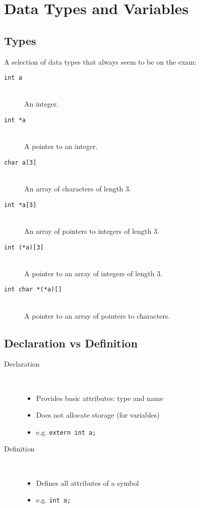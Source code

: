 \documentclass[a4paper]{article}
\begin{document}
\tableofcontents

\section{Data Types and Variables}

\subsection{Types}

A selection of data types that always seem to be on the exam:

\begin{description}
  \item[\texttt{int a}] \hfill \\
    An integer.
  \item[\texttt{int *a}] \hfill \\
    A pointer to an integer.
  \item[\texttt{char a[3]}] \hfill \\
    An array of characters of length 3.
  \item[\texttt{int *a[3]}] \hfill \\
    An array of pointers to integers of length 3.
  \item[\texttt{int (*a)[3]}] \hfill \\
    A pointer to an array of integers of length 3.
  \item[\texttt{int char *(*a)[]}] \hfill \\
    A pointer to an array of pointers to characters.
\end{description}

\subsection{Declaration vs Definition}

\begin{description}
  \item[Declaration] \hfill \\
    \begin{itemize}
      \item Provides basic attributes: type and name
      \item Does not allocate storage (for variables)
      \item e.g. \texttt{extern int a;}
    \end{itemize}

  \item[Definition] \hfill \\
    \begin{itemize}
      \item Defines all attributes of a symbol
      \item e.g. \texttt{int a;}
    \end{itemize}
\end{description}
\end{document}
